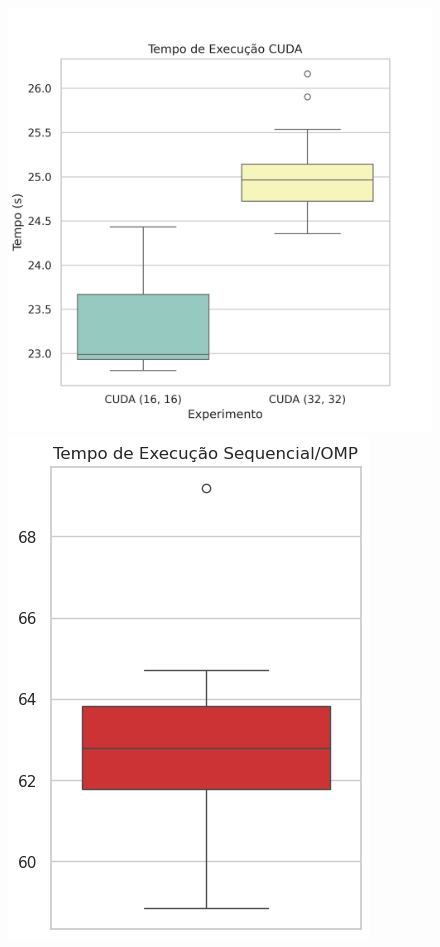 \documentclass[12pt]{article}
\begin{document}
\begin{figure}[ht]
  \centering
  \begin{minipage}[b]{0.37\textwidth}
    \centering
    \includegraphics[width=\textwidth]{figs/times_boxplot_cuda.png}
  \end{minipage}
  \begin{minipage}[b]{0.25\textwidth}
    \centering
    \includegraphics[width=\textwidth]{figs/times_boxplot_omp.png}

\end{minipage}
\end{figure}
\end{document}
